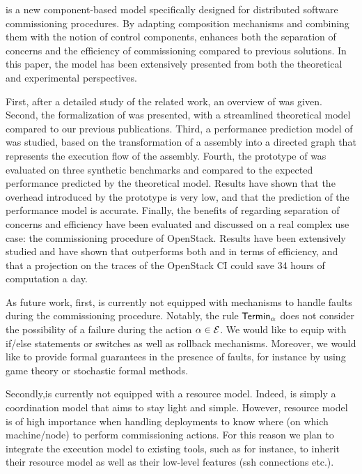 \mad is a new component-based model specifically designed for
distributed software commissioning procedures. By adapting composition
mechanisms and combining them with the notion of control components,
\mad enhances both the separation of concerns and the efficiency of
commissioning compared to previous solutions. In this paper, the \mad
model has been extensively presented from both the theoretical and
experimental perspectives.

First, after a detailed study of the related work, an overview of \mad
was given. Second, the formalization of \mad was presented, with a
streamlined theoretical model compared to our previous
publications. Third, a performance prediction model of \mad was
studied, based on the transformation of a \mad assembly into a
directed graph that represents the execution flow of the
assembly. Fourth, the prototype of \mad was evaluated on three
synthetic benchmarks and compared to the expected performance
predicted by the theoretical model. Results have shown that the
overhead introduced by the prototype is very low, and that the
prediction of the performance model is accurate. Finally, the benefits
of \mad regarding separation of concerns and efficiency have been
evaluated and discussed on a real complex use case: the commissioning
procedure of OpenStack. Results have been extensively studied and have
shown that
\mad outperforms both \ansible and \aeolus in terms of efficiency, and that a 
projection on the traces of the OpenStack CI could save 34 hours of computation a 
day.

As future work, first, \mad is currently not equipped with mechanisms to handle faults during the commissioning procedure. Notably, the rule $\mathsf{Termin}_\alpha$
does not consider the possibility of a failure during the action
$\alpha \in \mathcal{E}$. We would like to equip \mad with if/else statements or switches as well as rollback mechanisms. Moreover, we would like to provide formal guarantees in the presence of faults, for instance by using game theory or stochastic formal methods.

Secondly,\mad is currently not equipped with a resource model. Indeed, \mad is simply a coordination model that aims to stay light and simple. However, resource model is of high importance when handling deployments to know where (on which machine/node) to perform commissioning actions. For this reason we plan to integrate the \mad execution model to existing tools, such as \ansible for instance, to inherit their resource model as well as their low-level features (ssh connections etc.).

